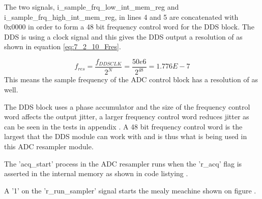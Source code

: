 

The two signals, i\_sample\_frq\_low\_int\_mem\_reg and i\_sample\_frq\_high\_int\_mem\_reg, in lines 4 and 5 are concatenated with 0x0000 in order to form a 48 bit frequency control word for the DDS block. The DDS is using a  clock signal and this gives the DDS output a resolution of  as shown in equation \ref{eq:7_2_10_Fres}.

\begin{equation}\label{eq:7_2_10_Fres}
    f_{res} = \frac{f_{DDSCLK}}{2^N} = \frac{50e6}{2^{48}} = 1.776E-7
\end{equation}
This means the sample frequency of the ADC control block has a resolution of  as well.

The DDS block uses a phase accumulator and the size of the frequency control word affects the output jitter, a larger frequency control word reduces jitter as can be seen in the tests in appendix . A 48 bit frequency control word is the largest that the DDS module can work with and is thus what is being used in this ADC resampler module.

The 'acq\_start' process in the ADC resampler runs when the 'r\_acq' flag is asserted in the internal memory as shown in code listying .



A '1' on the 'r\_run\_sampler' signal starts the mealy meachine shown on figure .

